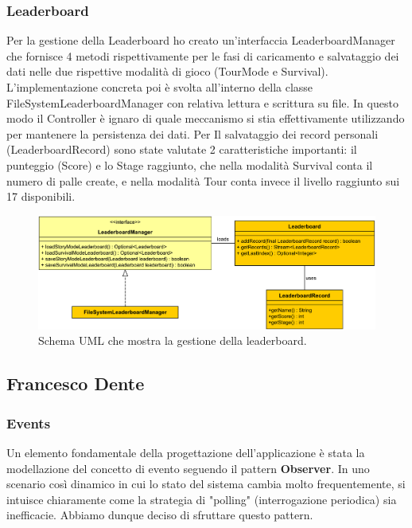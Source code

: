 \documentclass[a4paper,12pt]{report}
\begin{document}
\subsubsection*{Leaderboard}
Per la gestione della Leaderboard ho creato un'interfaccia LeaderboardManager che fornisce 4 metodi rispettivamente per le fasi di caricamento e salvataggio dei dati nelle due rispettive modalità di gioco (TourMode e Survival).
L'implementazione concreta poi è svolta all'interno della classe FileSystemLeaderboardManager con relativa lettura e scrittura su file. In questo modo il Controller è ignaro di quale meccanismo si stia effettivamente utilizzando per mantenere la persistenza dei dati.
Per Il salvataggio dei record personali (LeaderboardRecord) sono state valutate 2 caratteristiche importanti: il punteggio (Score) e lo Stage raggiunto, che nella modalità Survival conta il numero di palle create, e nella modalità Tour conta invece il livello raggiunto sui 17 disponibili. 

\begin{figure}[H]
\includegraphics[width=\linewidth]{img/leaderboard}
\caption{Schema UML che mostra la gestione della leaderboard.}
\label{img:leaderboard}
\end{figure}

\subsection*{Francesco Dente}

\subsubsection*{Events}

Un elemento fondamentale della progettazione dell'applicazione è stata la modellazione del concetto di evento seguendo il pattern \textbf{Observer}.
In uno scenario così dinamico in cui lo stato del sistema cambia molto frequentemente, si intuisce chiaramente come la strategia di "polling" (interrogazione periodica) sia inefficacie.
Abbiamo dunque deciso di sfruttare questo pattern.
\end{document}
